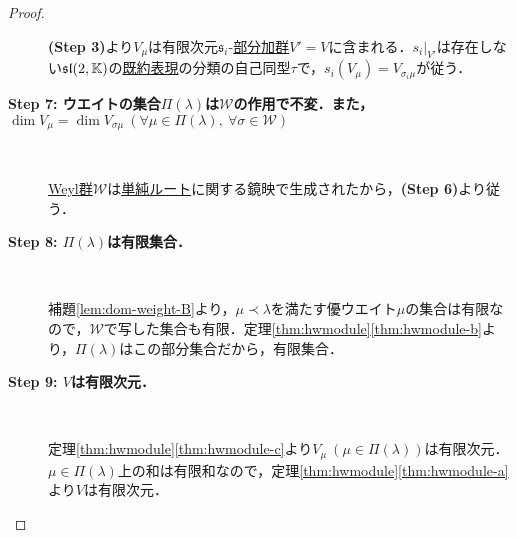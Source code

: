 \documentclass[rep_main]{subfiles}
\begin{document}
\begin{proof}
\begin{description}
		\textbf{(Step 3)}より$V_\mu$は有限次元$\mathfrak{s}_i$-\hyperref[def:sub-g-module]{部分加群}$V' = V$に含まれる．$s_i|_{V'}$は存在しない$\mathfrak{sl}(2, \mathbb{K})$の\hyperref[def:irr]{既約表現}の分類の自己同型$\tau$で，$s_i(V_\mu) = V_{\sigma_i\mu}$が従う．
		\item[\textbf{Step 7: ウエイトの集合$\Pi(\lambda)$は$\mathscr{W}$の作用で不変．また，$\dim V_\mu = \dim V_{\sigma\mu}\ (\forall \mu \in \Pi(\lambda),\ \forall \sigma \in \mathscr{W})$}]　
		
		\hyperref[def:Weylgroup]{Weyl群}$\mathscr{W}$は\hyperref[def:base-root]{単純ルート}に関する鏡映で生成されたから，\textbf{(Step 6)}より従う．
		\item[\textbf{Step 8: $\Pi(\lambda)$は有限集合．}]　
			
		補題\ref{lem:dom-weight-B}より，$\mu \prec \lambda$を満たす優ウエイト$\mu$の集合は有限なので，$\mathscr{W}$で写した集合も有限．定理\ref{thm:hwmodule}\ref{thm:hwmodule-b}より，$\Pi(\lambda)$はこの部分集合だから，有限集合．
		\item[\textbf{Step 9: $V$は有限次元．}]　
		
		定理\ref{thm:hwmodule}\ref{thm:hwmodule-c}より$V_\mu\ (\mu \in \Pi(\lambda))$は有限次元．$\mu \in \Pi(\lambda)$上の和は有限和なので，定理\ref{thm:hwmodule}\ref{thm:hwmodule-a}より$V$は有限次元．
	\end{description}
\end{proof}
\end{document}
